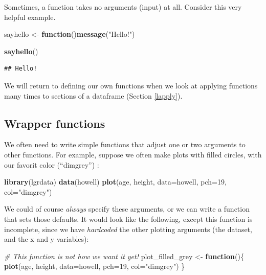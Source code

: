 \documentclass[]{book}
\newenvironment{Shaded}{\begin{snugshade}}{\end{snugshade}}
\newcommand{\CommentTok}[1]{\textcolor[rgb]{0.56,0.35,0.01}{\textit{#1}}}
\newcommand{\ControlFlowTok}[1]{\textcolor[rgb]{0.13,0.29,0.53}{\textbf{#1}}}
\newcommand{\DataTypeTok}[1]{\textcolor[rgb]{0.13,0.29,0.53}{#1}}
\newcommand{\DecValTok}[1]{\textcolor[rgb]{0.00,0.00,0.81}{#1}}
\newcommand{\KeywordTok}[1]{\textcolor[rgb]{0.13,0.29,0.53}{\textbf{#1}}}
\newcommand{\NormalTok}[1]{#1}
\newcommand{\StringTok}[1]{\textcolor[rgb]{0.31,0.60,0.02}{#1}}
\begin{document}
Sometimes, a function takes no arguments (input) at all. Consider this very helpful example.

\begin{Shaded}
\begin{Highlighting}[]
\NormalTok{sayhello <-}\StringTok{ }\ControlFlowTok{function}\NormalTok{()}\KeywordTok{message}\NormalTok{(}\StringTok{"Hello!"}\NormalTok{)}

\KeywordTok{sayhello}\NormalTok{()}
\end{Highlighting}
\end{Shaded}

\begin{verbatim}
## Hello!
\end{verbatim}

We will return to defining our own functions when we look at applying functions many times to sections of a dataframe (Section \ref{lapply}).

\hypertarget{wrapfunctions}{%
\subsection{Wrapper functions}\label{wrapfunctions}}

We often need to write simple functions that adjust one or two arguments to other functions. For example, suppose we often make plots with filled circles, with our favorit color (``dimgrey'') :

\begin{Shaded}
\begin{Highlighting}[]
\KeywordTok{library}\NormalTok{(lgrdata)}
\KeywordTok{data}\NormalTok{(howell)}
\KeywordTok{plot}\NormalTok{(age, height, }\DataTypeTok{data=}\NormalTok{howell, }\DataTypeTok{pch=}\DecValTok{19}\NormalTok{, }\DataTypeTok{col=}\StringTok{"dimgrey"}\NormalTok{)}
\end{Highlighting}
\end{Shaded}

We could of course \emph{always} specify these arguments, or we can write a function that sets those defaults. It would look like the following, except this function is incomplete, since we have \emph{hardcoded} the other plotting arguments (the dataset, and the x and y variables):

\begin{Shaded}
\begin{Highlighting}[]
\CommentTok{# This function is not how we want it yet!}
\NormalTok{plot_filled_grey <-}\StringTok{ }\ControlFlowTok{function}\NormalTok{()\{}
  \KeywordTok{plot}\NormalTok{(age, height, }\DataTypeTok{data=}\NormalTok{howell, }\DataTypeTok{pch=}\DecValTok{19}\NormalTok{, }\DataTypeTok{col=}\StringTok{"dimgrey"}\NormalTok{)}
\NormalTok{\}}
\end{Highlighting}
\end{Shaded}
\end{document}
